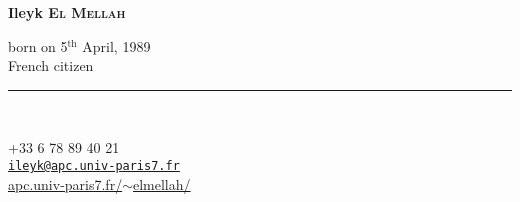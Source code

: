 \documentclass[a4paper,oneside]{cv}
\newcommand{\ligne}[1]{\rule[0.5ex]{\textwidth}{#1}\\}
\begin{document}
\begin{chapeau}
\begin{flushright}
\begin{adresse}
	\begin{Large}
	\textbf{Ileyk \textsc{El Mellah}}\\%
	\end{Large}	
	\begin{large}
	born on 5$^{\text{th}}$ April, 1989\\%
	French citizen\\%
	\end{large}
	\ligne\\%
	\begin{large}
	+33 6 78 89 40 21\\%
	\texttt{\href{mailto:ileyk@apc.univ-paris7.fr}{ileyk@apc.univ-paris7.fr}}\\
	\href{http://www.apc.univ-paris7.fr/~elmellah/}{apc.univ-paris7.fr/$\sim$elmellah/}\\
	\end{large}
\end{adresse}
\end{flushright}
\end{chapeau}
\vspace*{-2cm}
\\ \\ \\ \\ \\ \\
\end{document}
